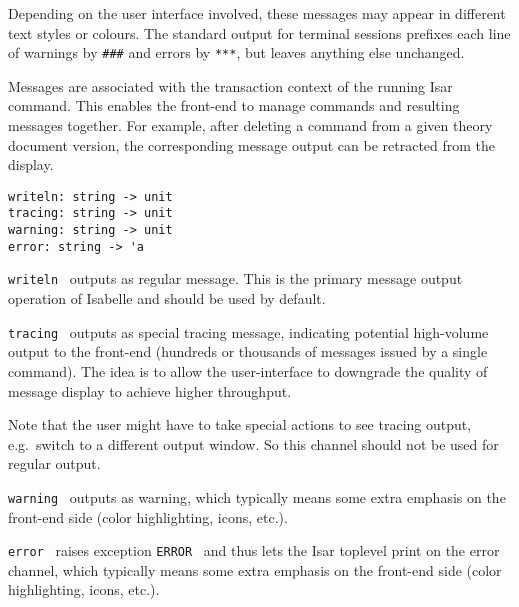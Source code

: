 \begin{isabellebody}
\begin{isamarkuptext}
  Depending on the user interface involved, these messages may appear
  in different text styles or colours.  The standard output for
  terminal sessions prefixes each line of warnings by \verb|###| and errors by \verb|***|, but leaves anything else
  unchanged.

  Messages are associated with the transaction context of the running
  Isar command.  This enables the front-end to manage commands and
  resulting messages together.  For example, after deleting a command
  from a given theory document version, the corresponding message
  output can be retracted from the display.%
\end{isamarkuptext}%
\isamarkuptrue%
%
\isadelimmlref
%
\endisadelimmlref
%
\isatagmlref
%
\begin{isamarkuptext}%
\begin{mldecls}
  \verb|writeln: string -> unit| \\
  \verb|tracing: string -> unit| \\
  \verb|warning: string -> unit| \\
  \verb|error: string -> 'a| \\
  \end{mldecls}

  \begin{description}

  \item \verb|writeln|~ outputs  as regular
  message.  This is the primary message output operation of Isabelle
  and should be used by default.

  \item \verb|tracing|~ outputs  as special
  tracing message, indicating potential high-volume output to the
  front-end (hundreds or thousands of messages issued by a single
  command).  The idea is to allow the user-interface to downgrade the
  quality of message display to achieve higher throughput.

  Note that the user might have to take special actions to see tracing
  output, e.g.\ switch to a different output window.  So this channel
  should not be used for regular output.

  \item \verb|warning|~ outputs  as
  warning, which typically means some extra emphasis on the front-end
  side (color highlighting, icons, etc.).

  \item \verb|error|~ raises exception \verb|ERROR|~ and thus lets the Isar toplevel print  on the
  error channel, which typically means some extra emphasis on the
  front-end side (color highlighting, icons, etc.).


\end{description}
\end{isamarkuptext}
\end{isabellebody}
